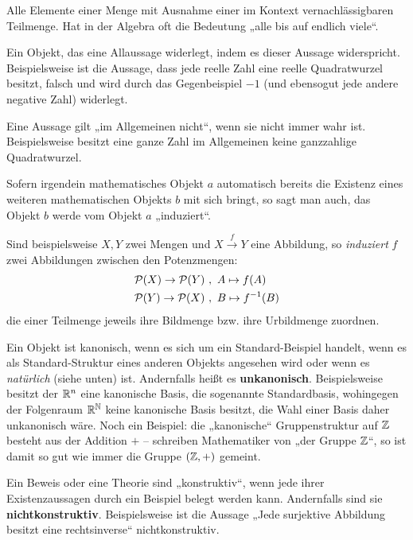 \begin{description}[labelindent=0pt, leftmargin=0pt]
    \item[Fast alle:] Alle Elemente einer Menge mit Ausnahme einer im Kontext vernachlässigbaren Teilmenge. Hat in der Algebra oft die Bedeutung „alle bis auf endlich viele“.

    \item[Gegenbeispiel:] Ein Objekt, das eine Allaussage widerlegt, indem es dieser Aussage widerspricht. Beispielsweise ist die Aussage, dass jede reelle Zahl eine reelle Quadratwurzel besitzt, falsch und wird durch das Gegenbeispiel $-1$ (und ebensogut jede andere negative Zahl) widerlegt.

    \item[Im Allgemeinen nicht:] Eine Aussage gilt „im Allgemeinen nicht“, wenn sie nicht immer wahr ist. Beispielsweise besitzt eine ganze Zahl im Allgemeinen keine ganzzahlige Quadratwurzel.
    
    \item[Induzieren:] Sofern irgendein mathematisches Objekt $a$ automatisch bereits die Existenz eines weiteren mathematischen Objekts $b$ mit sich bringt, so sagt man auch, das Objekt $b$ werde vom Objekt $a$ „induziert“.

    Sind beispielsweise $X,Y$ zwei Mengen und $X\xrightarrow{f} Y$ eine Abbildung, so \emph{induziert} $f$ zwei Abbildungen zwischen den Potenzmengen:
    \begin{align*}
        \mathcal P(X) \to \mathcal P(Y) \ & , \ A\mapsto f(A) \\
            \mathcal P(Y) \to \mathcal P(X) \ & , \ B\mapsto f^{-1}(B)
    \end{align*}
    die einer Teilmenge jeweils ihre Bildmenge bzw. ihre Urbildmenge zuordnen.
    
    \item[Kanonisch:] Ein Objekt ist kanonisch, wenn es sich um ein Standard-Beispiel handelt, wenn es als Standard-Struktur eines anderen Objekts angesehen wird oder wenn es \emph{natürlich} (siehe unten) ist. Andernfalls heißt es \textbf{unkanonisch}. Beispielsweise besitzt der $\mathbb R^n$ eine kanonische Basis, die sogenannte Standardbasis, wohingegen der Folgenraum $\mathbb R^\mathbb N$ keine kanonische Basis besitzt, die Wahl einer Basis daher unkanonisch wäre. Noch ein Beispiel: die „kanonische“ Gruppenstruktur auf $\mathbb Z$ besteht aus der Addition $+$ -- schreiben Mathematiker von „der Gruppe $\mathbb Z$“, so ist damit so gut wie immer die Gruppe $(\mathbb Z,+)$ gemeint.

    \item[Konstruktiv:] Ein Beweis oder eine Theorie sind „konstruktiv“, wenn jede ihrer Existenzaussagen durch ein Beispiel belegt werden kann. Andernfalls sind sie \textbf{nichtkonstruktiv}. Beispielsweise ist die Aussage „Jede surjektive Abbildung besitzt eine rechtsinverse“ nichtkonstruktiv.
    

\end{description}
